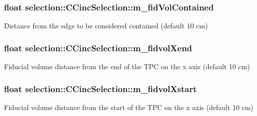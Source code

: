 \subsubsection[{\texorpdfstring{m\+\_\+fid\+Vol\+Contained}{m_fidVolContained}}]{\setlength{\rightskip}{0pt plus 5cm}float selection\+::\+C\+Cinc\+Selection\+::m\+\_\+fid\+Vol\+Contained\hspace{0.3cm}{\ttfamily [private]}}\hypertarget{classselection_1_1CCincSelection_a3412d86b03a97a65fed3d5d8a41ed2c0}{}\label{classselection_1_1CCincSelection_a3412d86b03a97a65fed3d5d8a41ed2c0}
Distance from the edge to be considered contained (default 10 cm) 
\subsubsection[{\texorpdfstring{m\+\_\+fidvol\+Xend}{m_fidvolXend}}]{\setlength{\rightskip}{0pt plus 5cm}float selection\+::\+C\+Cinc\+Selection\+::m\+\_\+fidvol\+Xend\hspace{0.3cm}{\ttfamily [private]}}\hypertarget{classselection_1_1CCincSelection_ae4bab4cf8ea55e54fcdaa66d2fe44c1d}{}\label{classselection_1_1CCincSelection_ae4bab4cf8ea55e54fcdaa66d2fe44c1d}
Fiducial volume distance from the end of the T\+PC on the x axis (default 10 cm) 
\subsubsection[{\texorpdfstring{m\+\_\+fidvol\+Xstart}{m_fidvolXstart}}]{\setlength{\rightskip}{0pt plus 5cm}float selection\+::\+C\+Cinc\+Selection\+::m\+\_\+fidvol\+Xstart\hspace{0.3cm}{\ttfamily [private]}}\hypertarget{classselection_1_1CCincSelection_aab38faac4866d19339aadbc3ac1eb55b}{}\label{classselection_1_1CCincSelection_aab38faac4866d19339aadbc3ac1eb55b}
Fiducial volume distance from the start of the T\+PC on the x axis (default 10 cm) 

